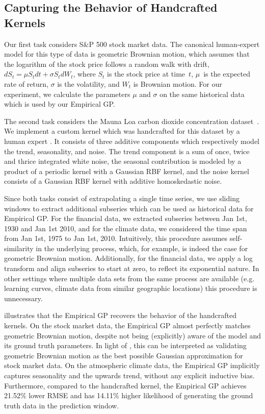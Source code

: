 \documentclass{article}
\begin{document}
\subsection{Capturing the Behavior of Handcrafted Kernels}
\label{sec:handcrafted_kernels}

Our first task considers S\&P 500 stock market data.
The canonical human-expert model for this type of data is geometric Brownian motion, which assumes that the logarithm of the stock price follows a random walk with drift, $dS_t = \mu S_t dt + \sigma S_t dW_t$,
where $S_t$ is the stock price at time~$t$, $\mu$~is the expected rate of return, $\sigma$ is the volatility, and $W_t$ is Brownian motion.
For our experiment, we calculate the parameters $\mu$ and $\sigma$ on the same historical data which is used by our Empirical GP.

The second task considers the Mauna Loa carbon dioxide concentration dataset~\citep{thoning2025co2}.
We implement a custom kernel which was handcrafted for this dataset by a human expert \citep{rasmussen2024co2model}.
It consists of three additive components which respectively model the trend, seasonality, and noise.
The trend component is a sum of once, twice and thrice integrated white noise, the seasonal contribution is modeled by a product of a periodic kernel with a Gaussian RBF kernel, and the noise kernel consists of a Gaussian RBF kernel with additive homoskedastic noise.

Since both tasks consist of extrapolating a single time series, we use sliding windows to extract additional subseries which can be used as historical data for Empirical GP.
For the financial data, we extracted subseries between Jan 1st, 1930 and Jan 1st 2010, and for the climate data, we considered the time span from Jan 1st, 1975 to Jan 1st, 2010. Intuitively, this procedure assumes self-similarity in the underlying process, which, for example, is indeed the case for geometric Brownian motion.
Additionally, for the financial data, we apply a log transform and align subseries to start at zero, to reflect its exponential nature. In other settings where multiple data sets from the same process are available (e.g. learning curves, climate data from similar geographic locations) this procedure is unnecessary.

 illustrates that the Empirical GP recovers the behavior of the handcrafted kernels.
On the stock market data, the Empirical GP almost perfectly matches geometric Brownian motion, despite not being (explicitly) aware of the model and its ground truth parameters.
In light of , this can be interpreted as validating geometric Brownian motion as the best possible Gaussian approximation for stock market data.
On the atmospheric climate data, the Empirical GP implicitly captures seasonality and the upwards trend, without any explicit inductive bias.
Furthermore, compared to the handcrafted kernel, the Empirical GP achieves 21.52\% lower RMSE and has 14.11\% higher likelihood of generating the ground truth data in the prediction window.
\end{document}
